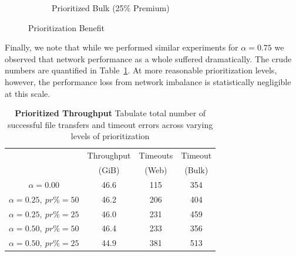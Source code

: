 \begin{figure}
\begin{subfigure}[t]{0.49\textwidth}
\label{fig:modifier_pr25_bulk}
		\vspace{-0.38cm}
		\caption{Prioritized Bulk (25\% Premium)}
	\end{subfigure}
\label{fig:measurements}
	\caption{Prioritization Benefit}
\end{figure}

Finally, we note that while we performed similar experiments for $\alpha = 0.75$
we observed that network performance as a whole suffered dramatically. The crude
numbers are quantified in Table~\ref{tab:modifier}. At more reasonable
prioritization levels, however, the performance loss from network imbalance is
statistically negligible at this scale.

\begin{table}
  \caption[Prioritized Throughput]{\textbf{Prioritized Throughput} Tabulate total
    number of successful file transfers and timeout errors across varying levels
    of prioritization}
  \begin{center}
    \begin{tabular}{ c c c c}
      & Throughput & Timeouts & Timeout \\
      & (GiB) & (Web) & (Bulk) \\ \hline
      $\alpha = 0.00$ & 46.6 & 115 & 354 \\ \hline
      $\alpha = 0.25,\ pr\% = 50$ & 46.2 & 206 & 404 \\
      $\alpha = 0.25,\ pr\% = 25$ & 46.0 & 231 & 459 \\ \hline
      $\alpha = 0.50,\ pr\% = 50$ & 46.4 & 233 & 356 \\
      $\alpha = 0.50,\ pr\% = 25$ & 44.9 & 381 & 513 \\
    \end{tabular}
  \end{center}
  \label{tab:modifier}
\end{table}
